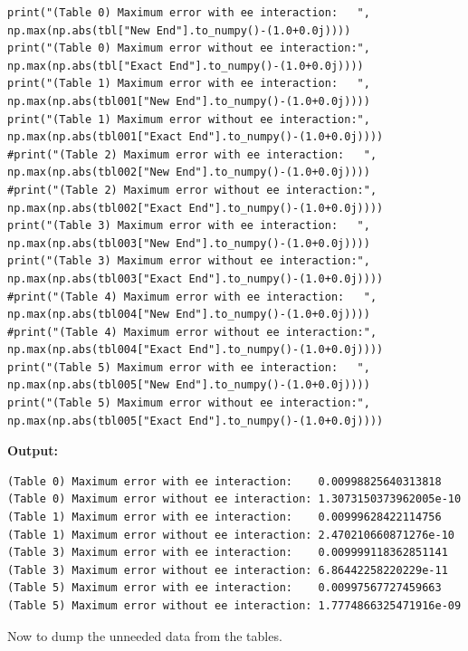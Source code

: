 \documentclass{article}
\begin{document}
\begin{lstlisting}
print("(Table 0) Maximum error with ee interaction:   ", np.max(np.abs(tbl["New End"].to_numpy()-(1.0+0.0j))))
print("(Table 0) Maximum error without ee interaction:", np.max(np.abs(tbl["Exact End"].to_numpy()-(1.0+0.0j))))
print("(Table 1) Maximum error with ee interaction:   ", np.max(np.abs(tbl001["New End"].to_numpy()-(1.0+0.0j))))
print("(Table 1) Maximum error without ee interaction:", np.max(np.abs(tbl001["Exact End"].to_numpy()-(1.0+0.0j))))
#print("(Table 2) Maximum error with ee interaction:   ", np.max(np.abs(tbl002["New End"].to_numpy()-(1.0+0.0j))))
#print("(Table 2) Maximum error without ee interaction:", np.max(np.abs(tbl002["Exact End"].to_numpy()-(1.0+0.0j))))
print("(Table 3) Maximum error with ee interaction:   ", np.max(np.abs(tbl003["New End"].to_numpy()-(1.0+0.0j))))
print("(Table 3) Maximum error without ee interaction:", np.max(np.abs(tbl003["Exact End"].to_numpy()-(1.0+0.0j))))
#print("(Table 4) Maximum error with ee interaction:   ", np.max(np.abs(tbl004["New End"].to_numpy()-(1.0+0.0j))))
#print("(Table 4) Maximum error without ee interaction:", np.max(np.abs(tbl004["Exact End"].to_numpy()-(1.0+0.0j))))
print("(Table 5) Maximum error with ee interaction:   ", np.max(np.abs(tbl005["New End"].to_numpy()-(1.0+0.0j))))
print("(Table 5) Maximum error without ee interaction:", np.max(np.abs(tbl005["Exact End"].to_numpy()-(1.0+0.0j))))\end{lstlisting}

\textbf{Output:}\begin{verbatim}
(Table 0) Maximum error with ee interaction:    0.00998825640313818
(Table 0) Maximum error without ee interaction: 1.3073150373962005e-10
(Table 1) Maximum error with ee interaction:    0.00999628422114756
(Table 1) Maximum error without ee interaction: 2.470210660871276e-10
(Table 3) Maximum error with ee interaction:    0.009999118362851141
(Table 3) Maximum error without ee interaction: 6.86442258220229e-11
(Table 5) Maximum error with ee interaction:    0.00997567727459663
(Table 5) Maximum error without ee interaction: 1.7774866325471916e-09

\end{verbatim}

Now to dump the unneeded data from the tables.
\end{document}
